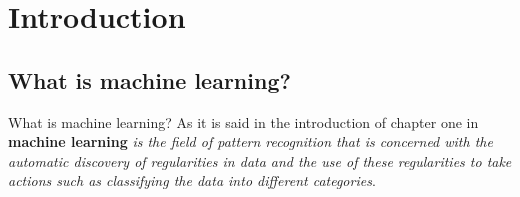 \renewcommand{\sectiontitle}{Introduction}
\section{\sectiontitle}

\renewcommand{\subsectiontitle}{What is machine learning?}
\subsection{\subsectiontitle}

\begin{frame}{\subsectiontitle}
    As it is said in the introduction of chapter one in  \cite{BishopPatternRecognition}
 \textbf{machine learning} \textit{is the field of pattern 
recognition that is concerned with the automatic
 discovery of regularities in data and the use of
these regularities to take actions such as 
classifying the data into different categories}.
\end{frame}

\renewcommand{\subsectiontitle}{Math formulation}
